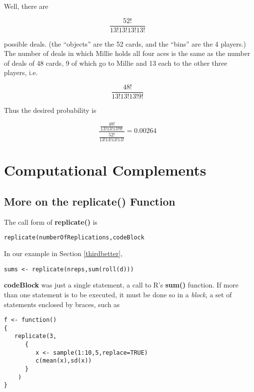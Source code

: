 Well, there are

\begin{equation}
\frac{52!}{13!13!13!13!}
\end{equation}

possible deals.  (the ``objects'' are the 52 cards, and the ``bins'' are
the 4 players.) The number of deals in which Millie holds all four aces
is the same as the number of deals of 48 cards, 9 of which go to Millie
and 13 each to the other three players, i.e.  

\begin{equation}
\frac{48!}{13!13!13!9!}
\end{equation}

Thus the desired probability is

\begin{equation}
\frac
{
\frac{48!}{13!13!13!9!}
}
{
\frac{52!}{13!13!13!13!}
}
= 0.00264
\end{equation}

\section{Computational Complements}

\subsection{More on the replicate() Function}

The call form of {\bf replicate()} is

\begin{lstlisting}
replicate(numberOfReplications,codeBlock
\end{lstlisting}

In our example in Section \ref{thirdbetter},

\begin{lstlisting}
sums <- replicate(nreps,sum(roll(d)))
\end{lstlisting}

{\bf codeBlock} was just a single statement, a call to R's {\bf sum()}
function.  If more than one statement is to be executed, it must be done
so in a {\it block}, a set of statements enclosed by braces, such as

\begin{lstlisting}
f <- function() 
{
   replicate(3,
      {
         x <- sample(1:10,5,replace=TRUE)
         c(mean(x),sd(x))
      }
    )
}
\end{lstlisting}

